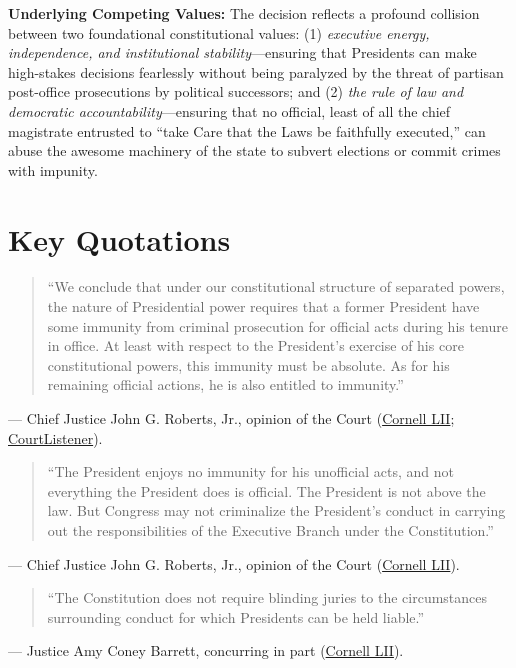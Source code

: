 \documentclass[12pt]{article}
\begin{document}
\textbf{Underlying Competing Values:} The decision reflects a profound collision between two foundational constitutional values: (1) \textit{executive energy, independence, and institutional stability}---ensuring that Presidents can make high-stakes decisions fearlessly without being paralyzed by the threat of partisan post-office prosecutions by political successors; and (2) \textit{the rule of law and democratic accountability}---ensuring that no official, least of all the chief magistrate entrusted to ``take Care that the Laws be faithfully executed,'' can abuse the awesome machinery of the state to subvert elections or commit crimes with impunity.

\section{Key Quotations}

\begin{quote}
``We conclude that under our constitutional structure of separated powers, the nature of Presidential power requires that a former President have some immunity from criminal prosecution for official acts during his tenure in office. At least with respect to the President's exercise of his core constitutional powers, this immunity must be absolute. As for his remaining official actions, he is also entitled to immunity.''
\end{quote}
\noindent --- Chief Justice John G. Roberts, Jr., opinion of the Court (\href{https://www.law.cornell.edu/supremecourt/text/23-939}{Cornell LII}; \href{https://www.courtlistener.com/opinion/10600038/trump-v-united-states/}{CourtListener}).

\begin{quote}
``The President enjoys no immunity for his unofficial acts, and not everything the President does is official. The President is not above the law. But Congress may not criminalize the President's conduct in carrying out the responsibilities of the Executive Branch under the Constitution.''
\end{quote}
\noindent --- Chief Justice John G. Roberts, Jr., opinion of the Court (\href{https://www.law.cornell.edu/supremecourt/text/23-939}{Cornell LII}).

\begin{quote}
``The Constitution does not require blinding juries to the circumstances surrounding conduct for which Presidents can be held liable.''
\end{quote}
\noindent --- Justice Amy Coney Barrett, concurring in part (\href{https://www.law.cornell.edu/supremecourt/text/23-939}{Cornell LII}).
\end{document}
